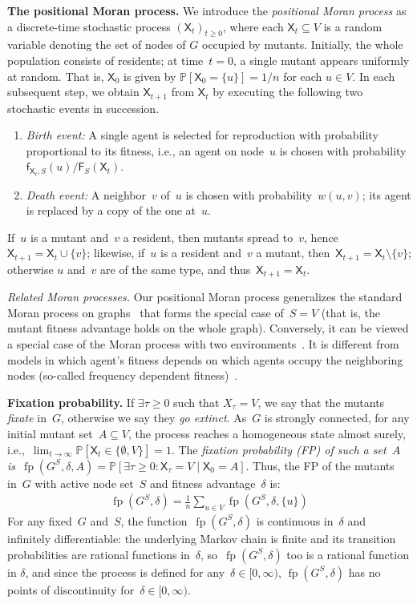 \documentclass[letterpaper]{article}
\def\Pr{\mathbb{P}}
\newcommand{\TotalFitness}{\mathsf{F}}
\newcommand{\Fitness}{\mathsf{f}}
\newcommand{\X}{\mathsf{X}}
\newcommand{\fp}{\operatorname{fp}}
\newcommand{\Paragraph}[1]{{\smallskip\noindent\bf #1}}
\newcommand{\SubParagraph}[1]{{\smallskip\noindent\em #1}}
\newcommand{\FitAdv}{\delta}
\newcommand{\Weight}{w}
\begin{document}
\Paragraph{The positional Moran process.} We introduce the \emph{positional Moran process} as a discrete-time stochastic process $(\X_t)_{t\geq 0}$, where each $\X_t\subseteq V$ is a random variable denoting the set of nodes of $G$ occupied by mutants. Initially, the whole population consists of residents; at time~$t=0$, a single mutant appears uniformly at random. That is, $\X_0$ is given by $\Pr[\X_0=\{u\}]=1/n$ for each $u\in V$. In each subsequent step, we obtain $\X_{t+1}$ from $\X_{t}$ by executing the following two stochastic events in succession.
\begin{enumerate}
\item \emph{Birth event:} A single agent is selected for reproduction with probability proportional to its fitness, i.e., an agent on node~$u$ is chosen with probability $\Fitness_{\X_t, S}(u)/\TotalFitness_{S}(\X_{t})$.
\item \emph{Death event:} A neighbor~$v$ of~$u$ is chosen with probability~$\Weight(u,v)$; its agent is replaced by a copy of the one at~$u$.
\end{enumerate}
If~$u$ is a mutant and~$v$ a resident, then mutants spread to~$v$, hence~$\X_{t+1} = \X_t \cup \{v\}$; likewise, if~$u$ is a resident and~$v$ a mutant, then~$\X_{t+1} = \X_t \setminus \{v\}$; otherwise $u$ and~$v$ are of the same type, and thus~$\X_{t+1}=\X_{t}$.

\SubParagraph{Related Moran processes.} 
Our positional Moran process generalizes the standard Moran process on graphs~\cite{Nowak2006}
that forms the special case of~$S \!=\! V$ (that is, the mutant fitness advantage holds on the whole graph).
Conversely, it can be viewed a special case of the Moran process with two environments~\cite{Kaveh2019}.
It is different from models in which agent's fitness depends on which agents occupy the neighboring nodes
(so-called frequency dependent fitness)~\cite{Huang2010}.

\Paragraph{Fixation probability.} 
If $\exists\tau \ge 0$ such that $X_{\tau}=V$, we say that the mutants \emph{fixate} in~$G$, otherwise we say they \emph{go extinct}. 
As~$G$ is strongly connected, for any initial mutant set~$A\subseteq V$, the process reaches a homogeneous state almost surely, i.e.,~$\lim_{t\to\infty} \Pr[\X_{t}\in \{\emptyset, V\}] = 1$. 
The \emph{fixation probability (FP) of such a set~$A$ is}~$\fp(G^S,\FitAdv, A) = \Pr[\exists\tau \ge 0\colon \X_{\tau} \!=\! V \mid \X_{0} \!=\! A]$. 
Thus, the FP of the mutants in~$G$ with active node set~$S$ and fitness advantage~$\FitAdv$ is:
\begin{align}
\fp(G^S,\FitAdv)=\frac{1}{n}\sum_{u\in V}\fp(G^S,\FitAdv, \{u\})
\end{align}
For any fixed~$G$ and~$S$, the function~$\fp(G^S,\FitAdv)$ is continuous in~$\FitAdv$ and infinitely differentiable: the underlying Markov chain is finite and its transition probabilities are rational functions in~$\FitAdv$, so~$\fp(G^S,\FitAdv)$ too is a rational function in $\FitAdv$, and since the process is defined for any~$\FitAdv\in[0,\infty)$, $\fp(G^S, \FitAdv)$ has no points of discontinuity for~$\delta\in[0,\infty)$.
\end{document}
